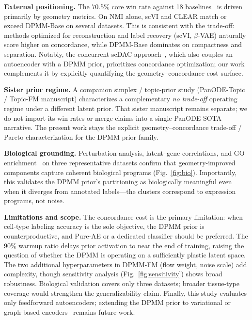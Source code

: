 \documentclass[biology,article,submit,pdftex,moreauthors]{Definitions/mdpi}
\begin{document}
\textbf{External positioning.}
The 70.5\% core win rate against 18 baselines~\cite{lopez2018deep,cao2020searching,xiong2022online,kingma2014auto,higgins2017beta,tran2021scdha} is driven primarily by geometry metrics. On NMI alone, scVI and CLEAR match or exceed DPMM-Base on several datasets. This is consistent with the trade-off: methods optimized for reconstruction and label recovery (scVI, $\beta$-VAE) naturally score higher on concordance, while DPMM-Base dominates on compactness and separation. Notably, the concurrent scDAC approach~\cite{an2024scdac}, which also couples an autoencoder with a DPMM prior, prioritizes concordance optimization; our work complements it by explicitly quantifying the geometry--concordance cost surface.

\textbf{Sister prior regime.}
A companion simplex / topic-prior study (PanODE-Topic / Topic-FM manuscript) characterizes a complementary \emph{no trade-off} operating regime under a different latent prior. That sister manuscript remains separate; we do not import its win rates or merge claims into a single PanODE SOTA narrative. The present work stays the explicit geometry--concordance trade-off / Pareto characterization for the DPMM prior family.

\textbf{Biological grounding.}
Perturbation analysis, latent--gene correlations, and GO enrichment~\cite{ashburner2000gene} on three representative datasets confirm that geometry-improved components capture coherent biological programs (Fig.~\ref{fig:bio}). Importantly, this validates the DPMM prior's partitioning as biologically meaningful even when it diverges from annotated labels---the clusters correspond to expression programs, not noise.

\textbf{Limitations and scope.}
The concordance cost is the primary limitation: when cell-type labeling accuracy is the sole objective, the DPMM prior is counterproductive, and Pure-AE or a dedicated classifier should be preferred. The 90\% warmup ratio delays prior activation to near the end of training, raising the question of whether the DPMM is operating on a sufficiently plastic latent space. The two additional hyperparameters in DPMM-FM (flow weight, noise scale) add complexity, though sensitivity analysis (Fig.~\ref{fig:sensitivity}) shows broad robustness. Biological validation covers only three datasets; broader tissue-type coverage would strengthen the generalizability claim. Finally, this study evaluates only feedforward autoencoders; extending the DPMM prior to variational or graph-based encoders~\cite{duque2022grae} remains future work.
\end{document}
